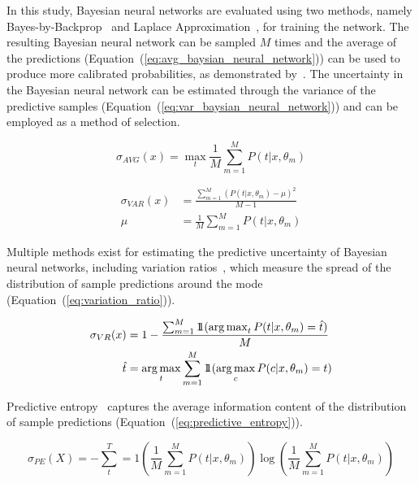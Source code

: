 In this study, Bayesian neural networks are evaluated using two methods, namely Bayes-by-Backprop~\citep{blundell2015weight} and Laplace Approximation~\citep{mackay1992bayesian}, for training the network. The resulting Bayesian neural network can be sampled $M$ times and the average of the predictions (Equation~(\ref{eq:avg_baysian_neural_network})) can be used to produce more calibrated probabilities, as demonstrated by~\citep{jospin2022hands}. The uncertainty in the Bayesian neural network can be estimated through the variance of the predictive samples (Equation~(\ref{eq:var_baysian_neural_network})) and can be employed as a method of selection.

\begin{equation}
	\sigma_{AVG}(x)=\max_t\frac{1}{M}\sum^M_{m=1}P(t|x,\theta_m)
	\label{eq:avg_baysian_neural_network}
\end{equation}

\begin{equation}
	\begin{aligned}
		\sigma_{VAR}(x)&=\frac{\sum^M_{m=1}(P(t|x,\theta_m)-\mu)^2}{M-1}\\
		\mu&=\frac{1}{M}\sum^M_{m=1}P(t|x,\theta_m)
	\end{aligned}
	\label{eq:var_baysian_neural_network}
\end{equation}

Multiple methods exist for estimating the predictive uncertainty of Bayesian neural networks, including variation ratios~\citep{freeman1965elementary}, which measure the spread of the distribution of sample predictions around the mode (Equation~(\ref{eq:variation_ratio})).

\begin{equation}
	\begin{aligned}
		\sigma_{VR}(x) &= 1 - \frac{\sum^M_{m=1}1\!\!1(\operatorname*{arg\,max}_tP(t|x,\theta_m)=\hat{t})}{M}\\
		\qquad\hat{t} &= \operatorname*{arg\,max}_t\sum^M_{m=1}1\!\!1(\operatorname*{arg\,max}_cP(c|x,\theta_m)=t)
	\end{aligned}
	\label{eq:variation_ratio}
\end{equation}

\noindent Predictive entropy~\citep{shannon1948mathematical} captures the average information content of the distribution of sample predictions (Equation~(\ref{eq:predictive_entropy})).
   
\begin{equation}
	\sigma_{PE}(X)=-\sum^T_t=1\left(\frac{1}{M}\sum^M_{m=1}P(t|x,\theta_m)\right)\log\left(\frac{1}{M}\sum^M_{m=1}P(t|x,\theta_m)\right)
	\label{eq:predictive_entropy}
\end{equation}

